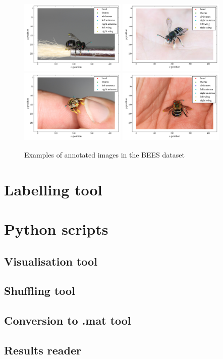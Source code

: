 \documentclass[11pt, oneside]{report}
\begin{document}
\begin{figure}[h]
    \centering
    \includegraphics[width=0.45\textwidth]{b1.pdf}\quad\quad\quad
    \includegraphics[width=0.45\textwidth]{b2.pdf}
    \includegraphics[width=0.45\textwidth]{b3.pdf}\quad\quad\quad
    \includegraphics[width=0.45\textwidth]{b4.pdf}
    \caption{Examples of annotated images in the BEES dataset}
    \label{fig:BEES_examples}
\end{figure}

\chapter{Labelling tool}

\chapter{Python scripts}
\section{Visualisation tool}
\section{Shuffling tool}
\section{Conversion to .mat tool}
\section{Results reader}
\end{document}
